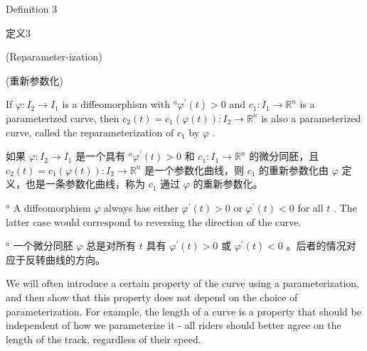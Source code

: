\HRule

Definition 3

\begin{tcolorbox}
定义3
\end{tcolorbox}

(Reparameter-ization)

\begin{tcolorbox}
(重新参数化)
\end{tcolorbox}

\HRule

If \(\varphi  : {I}_{2} \rightarrow  {I}_{1}\) is a diffeomorphism with \({}^{a}{\varphi }^{\prime }\left( t\right)  > 0\) and \({c}_{1} : {I}_{1} \rightarrow  {\mathbb{R}}^{n}\) is a parameterized curve, then \({c}_{2}\left( t\right)  = {c}_{1}\left( {\varphi \left( t\right) }\right)  : {I}_{2} \rightarrow  {\mathbb{R}}^{n}\) is also a parameterized curve, called the reparameterization of \({c}_{1}\) by \(\varphi\) .

\begin{tcolorbox}
如果 \(\varphi  : {I}_{2} \rightarrow  {I}_{1}\) 是一个具有 \({}^{a}{\varphi }^{\prime }\left( t\right)  > 0\) 和 \({c}_{1} : {I}_{1} \rightarrow  {\mathbb{R}}^{n}\) 的微分同胚，且 \({c}_{2}\left( t\right)  = {c}_{1}\left( {\varphi \left( t\right) }\right)  : {I}_{2} \rightarrow  {\mathbb{R}}^{n}\) 是一个参数化曲线，则 \({c}_{1}\) 的重新参数化由 \(\varphi\) 定义，也是一条参数化曲线，称为 \({c}_{1}\) 通过 \(\varphi\) 的重新参数化。
\end{tcolorbox}

\({}^{a}\) A diffeomorphism \(\varphi\) always has either \({\varphi }^{\prime }\left( t\right)  > 0\) or \({\varphi }^{\prime }\left( t\right)  < 0\) for all \(t\) . The latter case would correspond to reversing the direction of the curve.

\begin{tcolorbox}
\({}^{a}\) 一个微分同胚 \(\varphi\) 总是对所有 \(t\) 具有 \({\varphi }^{\prime }\left( t\right)  > 0\) 或 \({\varphi }^{\prime }\left( t\right)  < 0\) 。后者的情况对应于反转曲线的方向。
\end{tcolorbox}

We will often introduce a certain property of the curve using a parameterization, and then show that this property does not depend on the choice of parameterization. For example, the length of a curve is a property that should be independent of how we parameterize it - all riders should better agree on the length of the track, regardless of their speed.

